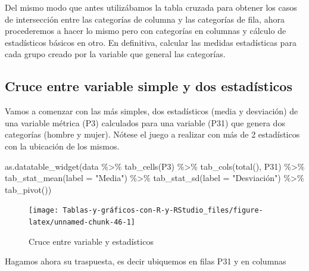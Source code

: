\documentclass[
]{book}
\newenvironment{Shaded}{\begin{snugshade}}{\end{snugshade}}
\newcommand{\AttributeTok}[1]{\textcolor[rgb]{0.77,0.63,0.00}{#1}}
\newcommand{\FunctionTok}[1]{\textcolor[rgb]{0.00,0.00,0.00}{#1}}
\newcommand{\NormalTok}[1]{#1}
\newcommand{\SpecialCharTok}[1]{\textcolor[rgb]{0.00,0.00,0.00}{#1}}
\newcommand{\StringTok}[1]{\textcolor[rgb]{0.31,0.60,0.02}{#1}}
\begin{document}
Del mismo modo que antes utilizábamos la tabla cruzada para obtener los casos de intersección entre las categorías de columna y las categorías de fila, ahora procederemos a hacer lo mismo pero con categorías en columnas y cálculo de estadísticos básicos en otro. En definitiva, calcular las medidas estadísticas para cada grupo creado por la variable que general las categorías.

\hypertarget{cruce-entre-variable-simple-y-dos-estaduxedsticos}{%
\subsection{Cruce entre variable simple y dos estadísticos}\label{cruce-entre-variable-simple-y-dos-estaduxedsticos}}

Vamos a comenzar con las más simples, dos estadísticos (media y desviación) de una variable métrica (P3) calculados para una variable (P31) que genera dos categorías (hombre y mujer). Nótese el juego a realizar con más de 2 estadísticos con la ubicación de los mismos.

\begin{Shaded}
\begin{Highlighting}[]
\FunctionTok{as.datatable\_widget}\NormalTok{(data }\SpecialCharTok{\%\textgreater{}\%} \FunctionTok{tab\_cells}\NormalTok{(P3) }\SpecialCharTok{\%\textgreater{}\%} \FunctionTok{tab\_cols}\NormalTok{(}\FunctionTok{total}\NormalTok{(), }
\NormalTok{  P31) }\SpecialCharTok{\%\textgreater{}\%} \FunctionTok{tab\_stat\_mean}\NormalTok{(}\AttributeTok{label =} \StringTok{"Media"}\NormalTok{) }\SpecialCharTok{\%\textgreater{}\%} \FunctionTok{tab\_stat\_sd}\NormalTok{(}\AttributeTok{label =} \StringTok{"Desviación"}\NormalTok{) }\SpecialCharTok{\%\textgreater{}\%} 
  \FunctionTok{tab\_pivot}\NormalTok{())}
\end{Highlighting}
\end{Shaded}

\begin{figure}[H]

{\centering \texttt{[image: Tablas-y-gráficos-con-R-y-RStudio\_files/figure-latex/unnamed-chunk-46-1]} 

}

\caption{Cruce entre variable y estadísticos}\label{fig:unnamed-chunk-46}
\end{figure}

Hagamos ahora su traspuesta, es decir ubiquemos en filas P31 y en columnas
\end{document}
